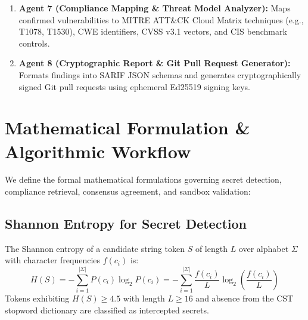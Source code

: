\documentclass[runningheads]{llncs}
\begin{document}
\begin{enumerate}
\begin{itemize}
\begin{itemize}
            \item \textbf{AWS:} Validated in an isolated LocalStack v3.4 container~\cite{localstack2024} emulating 45+ AWS APIs via \texttt{terraform plan} and \texttt{terraform apply}.
            \item \textbf{Azure:} Validated using Microsoft Azurite (local emulator for Blob, Queue, and Table storage) coupled with the AzureRM Terraform Provider running in local mock mode (\texttt{terraform plan} with the \texttt{-detailed-exitcode} flag), validating resource graph resolution and state construction without live cloud billing.
            \item \textbf{GCP:} Validated using Google Cloud Local Emulators (Storage, Pub/Sub, Firestore) and GCP Provider dry-run planning, integrated with Google's \texttt{gcloud beta terraform vet} policy evaluator against Cloud Asset Inventory constraints.
            \item \textbf{Kubernetes:} Validated against isolated local \texttt{k3s}/\texttt{minikube} Docker clusters using \texttt{kubectl apply --dry-run=server}.
        \end{itemize}
    \end{itemize}
    \item \textbf{Agent 7 (Compliance Mapping \& Threat Model Analyzer):} Maps confirmed vulnerabilities to MITRE ATT\&CK Cloud Matrix techniques (e.g., T1078, T1530), CWE identifiers, CVSS v3.1 vectors, and CIS benchmark controls.
    \item \textbf{Agent 8 (Cryptographic Report \& Git Pull Request Generator):} Formats findings into SARIF JSON schemas and generates cryptographically signed Git pull requests using ephemeral Ed25519 signing keys.
\end{enumerate}


\section{Mathematical Formulation \& Algorithmic Workflow}
We define the formal mathematical formulations governing secret detection, compliance retrieval, consensus agreement, and sandbox validation:

\subsection{Shannon Entropy for Secret Detection}
The Shannon entropy of a candidate string token $S$ of length $L$ over alphabet $\Sigma$ with character frequencies $f(c_i)$ is:
\begin{equation}
H(S) = -\sum_{i=1}^{|\Sigma|} P(c_i) \log_2 P(c_i) = -\sum_{i=1}^{|\Sigma|} \frac{f(c_i)}{L} \log_2 \left(\frac{f(c_i)}{L}\right)
\end{equation}
Tokens exhibiting $H(S) \ge 4.5$ with length $L \ge 16$ and absence from the CST stopword dictionary are classified as intercepted secrets.
\end{document}
